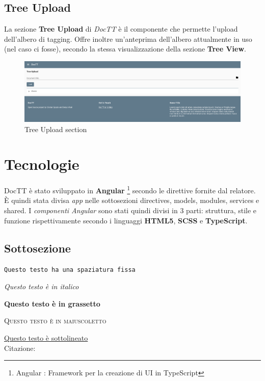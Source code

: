 \documentclass[twoside]{supsistudent}
\begin{document}
\pagebreak

\subsection{Tree Upload}
La sezione \textbf{Tree Upload} di \textit{DocTT} è il componente che permette
l'upload dell'albero di tagging. Offre inoltre un'anteprima dell'albero 
attualmente in uso (nel caso ci fosse), secondo la stessa visualizzazione 
della sezione \textbf{Tree View}.
 
\begin{figure}[h!]
  \includegraphics[width=\linewidth]{figures/treeUpload.png}
  \caption{Tree Upload section}
  \label{fig:treeUpload}
\end{figure}

\section{Tecnologie}
DocTT è stato sviluppato in \textbf{Angular}
\footnote{Angular : Framework per la creazione di UI in TypeScript}
secondo le direttive fornite dal relatore. È quindi stata divisa \textit{app}
nelle sottosezioni directives, models, modules, services e shared. I 
\textit{componenti Angular} sono stati quindi divisi in 3 parti: struttura, 
stile e funzione rispettivamente secondo i linguaggi \textbf{HTML5}, 
\textbf{SCSS} e \textbf{TypeScript}.

\subsection{Sottosezione}

\texttt{Questo testo ha una spaziatura fissa}

\textit{Questo testo \`e in italico}

\textbf{Questo testo \`e in grassetto}

\textsc{Questo testo \`e in maiuscoletto}

\underline{Questo testo \`e sottolineato} \\

Citazione:
\begin{quote}
\lipsum[23]
\end{quote}
\end{document}
